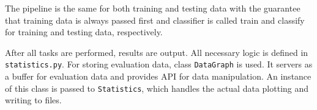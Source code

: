 The pipeline is the same for both training and testing data with the guarantee that
training data is always passed first and classifier is called train and classify for
training and testing data, respectively.

After all tasks are performed, results are  output.
All necessary logic is defined in \texttt{statistics.py}.
For storing evaluation data, class \texttt{DataGraph} is used.
It servers as a buffer for evaluation data and provides API for data manipulation.
An instance of this class is passed to \texttt{Statistics},
which handles the actual data plotting and writing to files.



